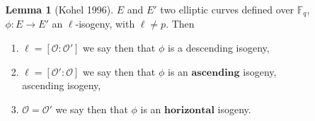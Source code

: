 \documentclass[10pt,a4paper]{beamer}
\theoremstyle{plain}
\theoremstyle{definition}
\newtheorem{lem}[thm]{Lemma}
\theoremstyle{definition}
\theoremstyle{definition}
\theoremstyle{definition}
\newtheorem{defi}[thm]{Definition}
\theoremstyle{remark}
\theoremstyle{remark}
\begin{document}
\begin{frame}
\begin{columns}
\begin{column}[r]{6cm}
{\begin{figure}
\begin{center}
\end{center}		
\end{figure}}


\end{column}
\begin{column}[left]{4cm}
\begin{lem}[Kohel 1996]
$E$ and $E'$ two elliptic curves defined over $\mathbb{F}_q$, $\phi :E \rightarrow E'$ an $\ell$-isogeny, with $\ell \neq p$. Then
\begin{enumerate}
\item  $\ell=[\mathcal{O} : \mathcal{O}']$ we say then that $\phi$ is a 
 {descending isogeny,}
\pause
\item $\ell=[\mathcal{O}':\mathcal{O}]$ we say then that $\phi$ is an  {$\textbf{ascending}$  isogeny,}
 {ascending  isogeny,}
\pause \item $\mathcal{O}=\mathcal{O}'$ we say then that $\phi$ is an $\textbf{horizontal}$ isogeny.
\end{enumerate}
\end{lem}
\end{column}

\end{columns}
\end{frame}
\end{document}
